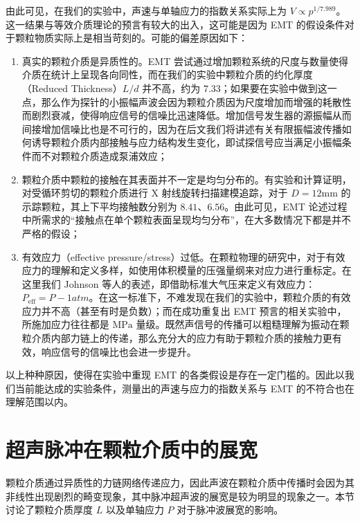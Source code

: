 由此可见，在我们的实验中，声速与单轴应力的指数关系实际上为 $V\propto p^{1/7.989}$。这一结果与等效介质理论的预言有较大的出入，这可能是因为 EMT 的假设条件对于颗粒物质实际上是相当苛刻的。可能的偏差原因如下：

\begin{enumerate}
  \item 真实的颗粒介质是异质性的。EMT 尝试通过增加颗粒系统的尺度与数量使得介质在统计上呈现各向同性，而在我们的实验中颗粒介质的约化厚度（Reduced Thickness）$L/d$ 并不高，约为 $7.33$；如果要在实验中做到这一点，那么作为探针的小振幅声波会因为颗粒介质因为尺度增加而增强的耗散性而剧烈衰减，使得响应信号的信噪比迅速降低。增加信号发生器的源振幅从而间接增加信噪比也是不可行的，因为在后文我们将讲述有关有限振幅波传播如何诱导颗粒介质内部接触与应力结构发生变化，即试探信号应当满足小振幅条件而不对颗粒介质造成泵浦效应；
  \item 颗粒介质中颗粒的接触在其表面并不一定是均匀分布的。有实验和计算证明，对受循环剪切的颗粒介质进行 X 射线旋转扫描建模追踪，对于 $D=12\unit{\milli\meter}$ 的示踪颗粒，其上下平均接触数分别为 $8.41$、$6.56$\cite{doi:10.1126/sciadv.abe8737}。由此可见，EMT 论述过程中所需求的“接触点在单个颗粒表面呈现均匀分布”，在大多数情况下都是并不严格的假设；
  \item 有效应力（effective pressure/stress）过低。在颗粒物理的研究中，对于有效应力的理解和定义多样，如使用体积模量的压强量纲来对应力进行重标定\cite{chengReviewAnalysisGranular2019}。在这里我们 Johnson 等人的表述，即借助标准大气压来定义有效应力： $P_{\text{eff}} = P - 1\unit{atm}$\cite{johnson_nonlinear_2005}。在这一标准下，不难发现在我们的实验中，颗粒介质的有效应力并不高（甚至有时是负数）；而在成功重复出 EMT 预言的相关实验中，所施加应力往往都是 $\unit{\mega\pascal}$ 量级。既然声信号的传播可以粗糙理解为振动在颗粒介质内部力链上的传递，那么充分大的应力有助于颗粒介质的接触力更有效，响应信号的信噪比也会进一步提升。
\end{enumerate}

以上种种原因，使得在实验中重现 EMT 的各类假设是存在一定门槛的。因此以我们当前能达成的实验条件，测量出的声速与应力的指数关系与 EMT 的不符合也在理解范围以内。


\section{超声脉冲在颗粒介质中的展宽}


颗粒介质通过异质性的力链网络传递应力，因此声波在颗粒介质中传播时会因为其非线性出现剧烈的畸变现象，其中脉冲超声波的展宽是较为明显的现象之一。本节讨论了颗粒介质厚度 $L$ 以及单轴应力 $P$ 对于脉冲波展宽的影响。

